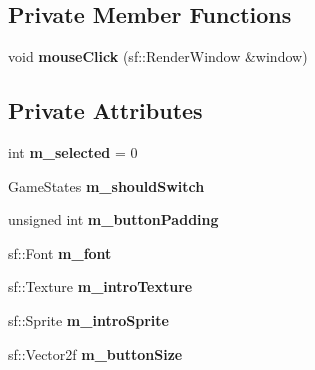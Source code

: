 \subsection*{Private Member Functions}
\begin{DoxyCompactItemize}
\item 
void {\bfseries mouse\+Click} (sf\+::\+Render\+Window \&window)\hypertarget{classMenu__State_aedafbb9cdbe7ea73ff6b071f2efbbcc7}{}\label{classMenu__State_aedafbb9cdbe7ea73ff6b071f2efbbcc7}

\end{DoxyCompactItemize}
\subsection*{Private Attributes}
\begin{DoxyCompactItemize}
\item 
int {\bfseries m\+\_\+selected} = 0\hypertarget{classMenu__State_a6f92167a44cbed6617f7e414635e25d6}{}\label{classMenu__State_a6f92167a44cbed6617f7e414635e25d6}

\item 
Game\+States {\bfseries m\+\_\+should\+Switch}\hypertarget{classMenu__State_af24544ecc5fed6140b168aab88623f96}{}\label{classMenu__State_af24544ecc5fed6140b168aab88623f96}

\item 
unsigned int {\bfseries m\+\_\+button\+Padding}\hypertarget{classMenu__State_a3ed213e87e2d099fc4e5b801da267289}{}\label{classMenu__State_a3ed213e87e2d099fc4e5b801da267289}

\item 
sf\+::\+Font {\bfseries m\+\_\+font}\hypertarget{classMenu__State_ae9b53d2fab5d229f54406726b4f3c33f}{}\label{classMenu__State_ae9b53d2fab5d229f54406726b4f3c33f}

\item 
sf\+::\+Texture {\bfseries m\+\_\+intro\+Texture}\hypertarget{classMenu__State_aa093886a5ac461678801c8dd44ad14b8}{}\label{classMenu__State_aa093886a5ac461678801c8dd44ad14b8}

\item 
sf\+::\+Sprite {\bfseries m\+\_\+intro\+Sprite}\hypertarget{classMenu__State_a269fbd2dd7504ef67a15aae1d75fdd8d}{}\label{classMenu__State_a269fbd2dd7504ef67a15aae1d75fdd8d}

\item 
sf\+::\+Vector2f {\bfseries m\+\_\+button\+Size}\hypertarget{classMenu__State_a33ff47deac34eac6412eed318f0ac26a}{}\label{classMenu__State_a33ff47deac34eac6412eed318f0ac26a}


\end{DoxyCompactItemize}
